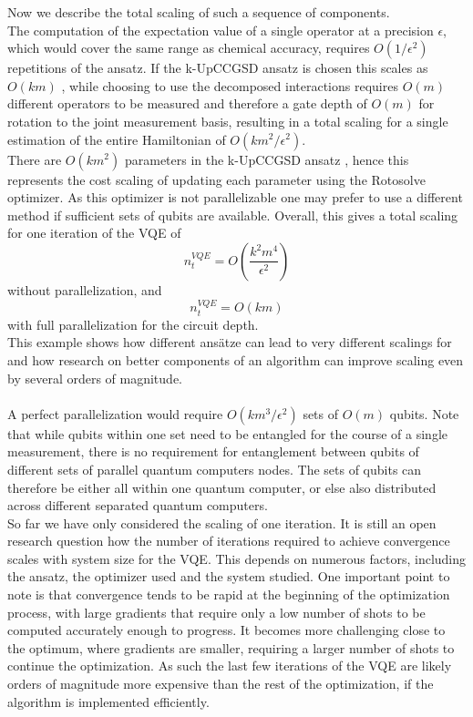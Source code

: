Now we describe the total scaling of such a sequence of components. \\
The computation of the expectation value of a single operator at a precision $\epsilon$, which would cover the same range as chemical accuracy, requires $O(1/\epsilon^2)$ repetitions of the ansatz. If the k-UpCCGSD ansatz is chosen this scales as $O(km)$ \cite{Lee2019Jan}, while choosing to use the decomposed interactions requires $O(m)$ different operators to be measured and therefore a gate depth of $O(m)$ for rotation to the joint measurement basis, resulting in a total scaling for a single estimation of the entire Hamiltonian of $O(km^2/\epsilon^2)$. \\
There are $O(km^2)$ parameters in the k-UpCCGSD ansatz \cite{Lee2019Jan}, hence this represents the cost scaling of updating each parameter using the Rotosolve optimizer. As this optimizer is not parallelizable one may prefer to use a different method if sufficient sets of qubits are available. Overall, this gives a total scaling for one iteration of the VQE of
\begin{equation}
    n_t^{VQE} = O\left( \frac{k^2m^4}{\epsilon^2} \right) \label{Scaling VQE 2}
\end{equation}
without parallelization, and
\begin{equation}
    n_t^{VQE} = O(km)
\end{equation}
with full parallelization for the circuit depth. \\
This example shows how different ansätze can lead to very different scalings for and how research on better components of an algorithm can improve scaling even by several orders of magnitude. \\
\\
A perfect parallelization would require $O(km^3/\epsilon^2)$ sets of $O(m)$ qubits. Note that while qubits within one set need to be entangled for the course of a single measurement, there is no requirement for entanglement between qubits of different sets of parallel quantum computers nodes. The sets of qubits can therefore be either all within one quantum computer, or else also distributed across different separated quantum computers. \\
So far we have only considered the scaling of one iteration. It is still an open research question how the number of iterations required to achieve convergence scales with system size for the VQE. This depends on numerous factors, including the ansatz, the optimizer used and the system studied. One important point to note is that convergence tends to be rapid at the beginning of the optimization process, with large gradients that require only a low number of shots to be computed accurately enough to progress. It becomes more challenging close to the optimum, where gradients are smaller, requiring a larger number of shots to continue the optimization. As such the last few iterations of the VQE are likely orders of magnitude more expensive than the rest of the optimization, if the algorithm is implemented efficiently.

